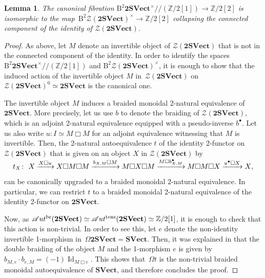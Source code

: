 \documentclass[pdftex]{sigma}
\newtheorem{Lemma}[Theorem]{Lemma}
\numberwithin{equation}{section}
\begin{document}
\begin{Lemma}\label{lem:supercohomolohyfibration}
The canonical fibration $\mathrm{B}^2\mathbf{2SVect}^{\times}//(\mathbb{Z}/2[1])\rightarrow \mathbb{Z}/2[2]$ is isomorphic to the map~$\mathrm{B}^2\mathscr{Z}(\mathbf{2SVect})^{\times}\!\!\rightarrow\! \mathbb{Z}/2[2]$ collapsing the connected component of the identity of $\mathscr{Z}(\mathbf{2SVect})$.
\end{Lemma}
\begin{proof}
As above, let $M$ denote an invertible object of $\mathscr{Z}(\mathbf{2SVect})$ that is not in the connected component of the identity. In order to identify the spaces $\mathrm{B}^2\mathbf{2SVect}^{\times}//(\mathbb{Z}/2[1])$ and $\mathrm{B}^2\mathscr{Z}(\mathbf{2SVect})^{\times}$, it is enough to show that the induced action of the invertible object $M$ in~$\mathscr{Z}(\mathbf{2SVect})$ on $\mathscr{Z}(\mathbf{2SVect})^0\simeq\mathbf{2SVect}$ is the canonical one.

The invertible object $M$ induces a braided monoidal 2-natural equivalence of $\mathbf{2SVect}$. More precisely, let us use $b$ to denote the braiding of $\mathscr{Z}(\mathbf{2SVect})$, which is an adjoint 2-natural equivalence equipped with a pseudo-inverse $b^{\bullet}$. Let us also write $u\colon I\simeq M\Box M$ for an adjoint equivalence witnessing that $M$ is invertible. Then, the 2-natural autoequivalence $t$ of the identity 2-functor on $\mathscr{Z}(\mathbf{2SVect})$ that is given on an object $X$ in $\mathscr{Z}(\mathbf{2SVect})$ by
\begin{gather*}
\smash{t_X\colon\ X\xrightarrow{X\Box u} X\Box M\Box M\xrightarrow{b_{X,M}\Box M} M\Box X\Box M\xrightarrow{M\Box b^{\bullet}_{X,M}} M\Box M\Box X\xrightarrow{u^{\bullet}\Box X}X},
\end{gather*}
 can be canonically upgraded to a braided monoidal 2-natural equivalence. In particular, we can restrict $t$ to a braided monoidal 2-natural equivalence of the identity 2-functor on $\mathbf{2SVect}$.

Now, as $\mathscr{A}ut^{\operatorname{br}}(\mathbf{2SVect})\simeq\mathscr{A}ut^{\rm tens}(\mathbf{2SVect})\simeq \mathbb{Z}/2[1]$, it is enough to check that this action is non-trivial. In order to see this, let $e$ denote the non-identity invertible 1-morphism in~$\Omega\mathbf{2SVect}=\mathbf{SVect}$. Then, it was explained in \cite[Section~3.1]{JFR} that the double braiding of the object $M$ and the 1-morphism $e$ is given by $b_{M,e}\cdot b_{e,M}=(-1) \operatorname{Id}_{M\Box e}$. This shows that~$\Omega t$ is the non-trivial braided monoidal autoequivalence of $\mathbf{SVect}$, and therefore concludes the proof.
\end{proof}
\end{document}
